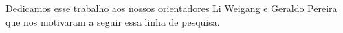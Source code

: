 Dedicamos esse trabalho aos nossos orientadores Li Weigang e Geraldo Pereira que nos motivaram a seguir essa linha de pesquisa.